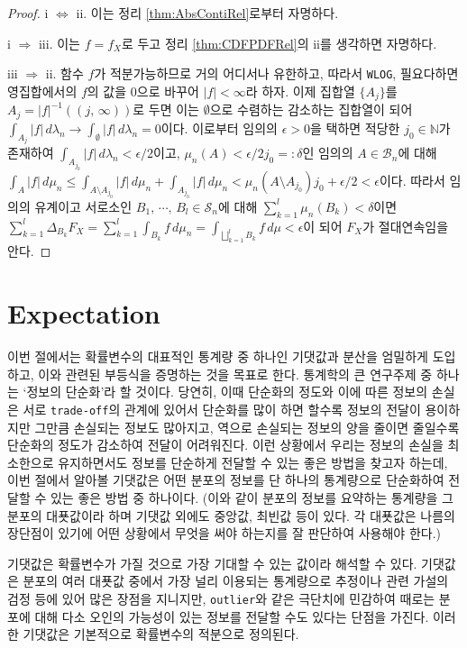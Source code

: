 \begin{proof}
    i $\Leftrightarrow$ ii. 이는 정리 \ref{thm:AbsContiRel}로부터 자명하다.

    i $\Rightarrow$ iii. 이는 $f=f_X$로 두고 정리 \ref{thm:CDFPDFRel}의 ii를 생각하면 자명하다.

    iii $\Rightarrow$ ii. 함수 $f$가 적분가능하므로 거의 어디서나 유한하고, 따라서 \texttt{WLOG}, 필요다하면 영집합에서의 $f$의 값을 $0$으로 바꾸어 $|f|<\infty$라 하자. 이제 집합열 $\{A_j\}$를 $A_j=|f|^{-1}((j,\,\infty))$로 두면 이는 $\emptyset$으로 수렴하는 감소하는 집합열이 되어 $\int_{A_j}|f|\,d\lambda_n\to\int_\emptyset|f|\,d\lambda_n=0$이다. 이로부터 임의의 $\epsilon>0$을 택하면 적당한 $j_0\in\mathbb{N}$가 존재하여 $\int_{A_{j_0}}|f|\,d\lambda_n<\epsilon/2$이고, $\mu_n(A)<\epsilon/2j_0=:\delta$인 임의의 $A\in\mathcal{B}_n$에 대해 $\int_A|f|\,d\mu_n\leq\int_{A\setminus A_{j_0}}|f|\,d\mu_n+\int_{A_{j_0}}|f|\,d\mu_n<\mu_n(A\setminus A_{j_0})j_0+\epsilon/2<\epsilon$이다. 따라서 임의의 유계이고 서로소인 $B_1,\,\cdots,\,B_l\in\mathcal{S}_n$에 대해 $\sum_{k=1}^l\mu_n(B_k)<\delta$이면 $\sum_{k=1}^l\Delta_{B_k}F_X=\sum_{k=1}^l\int_{B_k}f\,d\mu_n=\int_{\bigsqcup_{k=1}^lB_k}f\,d\mu<\epsilon$이 되어 $F_X$가 절대연속임을 안다.
\end{proof}

\section{Expectation}

이번 절에서는 확률변수의 대표적인 통계량 중 하나인 기댓값과 분산을 엄밀하게 도입하고, 이와 관련된 부등식을 증명하는 것을 목표로 한다. 통계학의 큰 연구주제 중 하나는 `정보의 단순화'라 할 것이다. 당연히, 이때 단순화의 정도와 이에 따른 정보의 손실은 서로 \texttt{trade-off}의 관계에 있어서 단순화를 많이 하면 할수록 정보의 전달이 용이하지만 그만큼 손실되는 정보도 많아지고, 역으로 손실되는 정보의 양을 줄이면 줄일수록 단순화의 정도가 감소하여 전달이 어려워진다. 이런 상황에서 우리는 정보의 손실을 최소한으로 유지하면서도 정보를 단순하게 전달할 수 있는 좋은 방법을 찾고자 하는데, 이번 절에서 알아볼 기댓값은 어떤 분포의 정보를 단 하나의 통계량으로 단순화하여 전달할 수 있는 좋은 방법 중 하나이다. (이와 같이 분포의 정보를 요약하는 통계량을 그 분포의 대푯값이라 하며 기댓값 외에도 중앙값, 최빈값 등이 있다. 각 대푯값은 나름의 장단점이 있기에 어떤 상황에서 무엇을 써야 하는지를 잘 판단하여 사용해야 한다.) 

기댓값은 확률변수가 가질 것으로 가장 기대할 수 있는 값이라 해석할 수 있다. 기댓값은 분포의 여러 대푯값 중에서 가장 널리 이용되는 통계량으로 추정이나 관련 가설의 검정 등에 있어 많은 장점을 지니지만, \texttt{outlier}와 같은 극단치에 민감하여 때로는 분포에 대해 다소 오인의 가능성이 있는 정보를 전달할 수도 있다는 단점을 가진다. 이러한 기댓값은 기본적으로 확률변수의 적분으로 정의된다.

